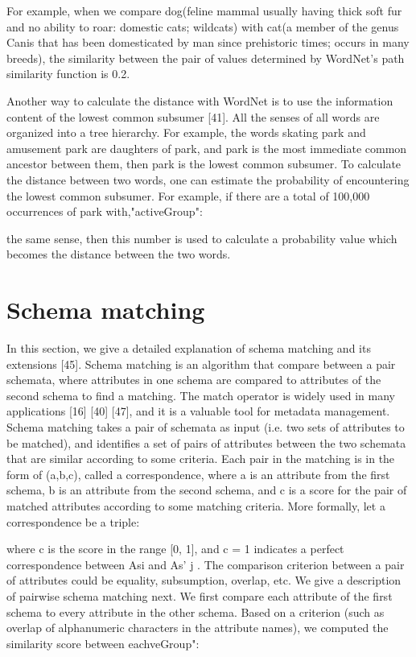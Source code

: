For example, when we compare dog(feline mammal usually having thick soft fur and no ability to roar: domestic cats; wildcats) with cat(a member of the genus Canis that has been domesticated by man since prehistoric times; occurs in many breeds), the similarity between the pair of values determined by WordNet's path similarity function is 0.2.

Another way to calculate the distance with WordNet is to use the information content of the lowest common subsumer \cite{Resnik1970Using}[41]. All the senses of all words are organized into a tree hierarchy. For example, the words skating park and amusement park are daughters of park, and park is the most immediate common ancestor between them, then park is the lowest common subsumer. To calculate the distance between two words, one can estimate the probability of encountering the lowest common subsumer. For example, if there are a total of 100,000 occurrences of park with,"activeGroup":

the same sense, then this number is used to calculate a probability value which becomes the distance between the two words.

\section{Schema matching}
\label{sec:SchemaMatching}

In this section, we give a detailed explanation of schema matching and its extensions \cite{Sorrentino2011NORMS}[45]. Schema matching is an algorithm that compare between a pair schemata, where attributes in one schema are compared to attributes of the second schema to find a matching. The match operator is widely used in many applications \cite{Dong2012Proceedings}[16] \cite{Rahm2001Survey}[40] \cite{10.1145/3183713.3183729}[47], and it is a valuable tool for metadata management. Schema matching takes a pair of schemata as input (i.e. two sets of attributes to be matched), and identifies a set of pairs of attributes between the two schemata that are similar according to some criteria. Each pair in the matching is in the form of (a,b,c), called a correspondence, where a is an attribute from the first schema, b is an attribute from the second schema, and c is a score for the pair of matched attributes according to some matching criteria.
More formally, let a correspondence be a triple:

where c is the score in the range [0, 1], and c = 1 indicates a perfect correspondence between Asi and As' j . The comparison criterion between a pair of attributes could be equality, subsumption, overlap, etc.
We give a description of pairwise schema matching next. We first compare each attribute of the first schema to every attribute in the other schema. Based on a criterion (such as overlap of alphanumeric characters in the attribute names), we computed the similarity score between eachveGroup":


